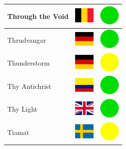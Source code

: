\documentclass[12pt, a4paper, twoside]{report}
\begin{document}
\begin{center}
\begin{longtable}{|p{5cm}|p{2cm}|p{2cm}|}
 Through the Void                                           & \includegraphics[width=1cm]{../img/flags/be} &   \includegraphics[width=1cm]{../likes/y} \\ \hline
 Thrudvangar                                                & \includegraphics[width=1cm]{../img/flags/de} &   \includegraphics[width=1cm]{../likes/y} \\ \hline
 Thunderstorm                                               & \includegraphics[width=1cm]{../img/flags/de} &   \includegraphics[width=1cm]{../likes/m} \\ \hline
 Thy Antichrist                                             & \includegraphics[width=1cm]{../img/flags/co} &   \includegraphics[width=1cm]{../likes/y} \\ \hline
 Thy Light                                                  & \includegraphics[width=1cm]{../img/flags/gb} &   \includegraphics[width=1cm]{../likes/y} \\ \hline
 Tiamat                                                     & \includegraphics[width=1cm]{../img/flags/se} &   \includegraphics[width=1cm]{../likes/m} \\ \hline

\end{longtable}
\end{center}
\end{document}
